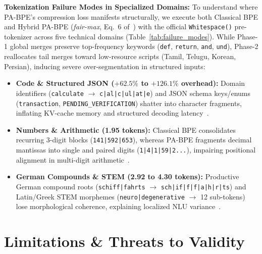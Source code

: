 \textbf{Tokenization Failure Modes in Specialized Domains:} To understand where PA-BPE's compression loss manifests structurally, we execute both Classical BPE and Hybrid PA-BPE (\textit{fair-max}, Eq.~6 of~\cite{foroutan2026parity}) with the official \texttt{Whitespace()} pre-tokenizer across five technical domains (Table~\ref{tab:failure_modes}). While Phase-1 global merges preserve top-frequency keywords (\texttt{def}, \texttt{return}, \texttt{and}, \texttt{und}), Phase-2 reallocates tail merges toward low-resource scripts (Tamil, Telugu, Korean, Persian), inducing severe over-segmentation in structured inputs:
\begin{itemize}
    \item \textbf{Code \& Structured JSON ($+62.5\%$ to $+126.1\%$ overhead):} Domain identifiers (\texttt{calculate} $\rightarrow$ \texttt{c|al|c|ul|at|e}) and JSON schema keys/enums (\texttt{transaction}, \texttt{PENDING\_VERIFICATION}) shatter into character fragments, inflating KV-cache memory and structured decoding latency~\cite{petrov2023language,ahia2023all}.
    \item \textbf{Numbers \& Arithmetic (1.95 tokens):} Classical BPE consolidates recurring 3-digit blocks (\texttt{141|592|653}), whereas PA-BPE fragments decimal mantissas into single and paired digits (\texttt{1|4|1|59|2...}), impairing positional alignment in multi-digit arithmetic~\cite{singh2024tokenization}.
    \item \textbf{German Compounds \& STEM (2.92 to 4.30 tokens):} Productive German compound roots (\texttt{schiff|fahrts} $\rightarrow$ \texttt{sch|if|f|f|a|h|r|ts}) and Latin/Greek STEM morphemes (\texttt{neuro|degenerative} $\rightarrow$ 12 sub-tokens) lose morphological coherence, explaining localized NLU variance~\cite{foroutan2026parity}.
\end{itemize}

\section{Limitations \& Threats to Validity}
\label{sec:limitations}


